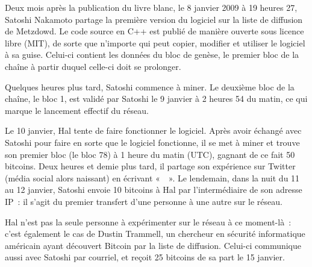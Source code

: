 
Deux mois après la publication du livre blanc, le 8 janvier 2009 à 19 heures 27, Satoshi Nakamoto partage la première version du logiciel sur la liste de diffusion de Metzdowd. Le code source en C++ est publié de manière ouverte sous licence libre (MIT), de sorte que n'importe qui peut copier, modifier et utiliser le logiciel à sa guise. Celui-ci contient les données du bloc de genèse, le premier bloc de la chaîne à partir duquel celle-ci doit se prolonger.

Quelques heures plus tard, Satoshi commence à miner. Le deuxième bloc de la chaîne, le bloc 1, est validé par Satoshi le 9 janvier à 2 heures 54 du matin, ce qui marque le lancement effectif du réseau.

Le 10 janvier, Hal tente de faire fonctionner le logiciel. Après avoir échangé avec Satoshi pour faire en sorte que le logiciel fonctionne, il se met à miner et trouve son premier bloc (le bloc 78) à 1 heure du matin (UTC), gagnant de ce fait 50 bitcoins. Deux heures et demie plus tard, il partage son expérience sur Twitter (média social alors naissant) en écrivant «~~». Le lendemain, dans la nuit du 11 au 12 janvier, Satoshi envoie 10 bitcoins à Hal par l'intermédiaire de son adresse IP~: il s'agit du premier transfert d'une personne à une autre sur le réseau.

Hal n'est pas la seule personne à expérimenter sur le réseau à ce moment-là~: c'est également le cas de Dustin Trammell, un chercheur en sécurité informatique américain ayant découvert Bitcoin par la liste de diffusion. Celui-ci communique aussi avec Satoshi par courriel, et reçoit 25 bitcoins de sa part le 15 janvier.

